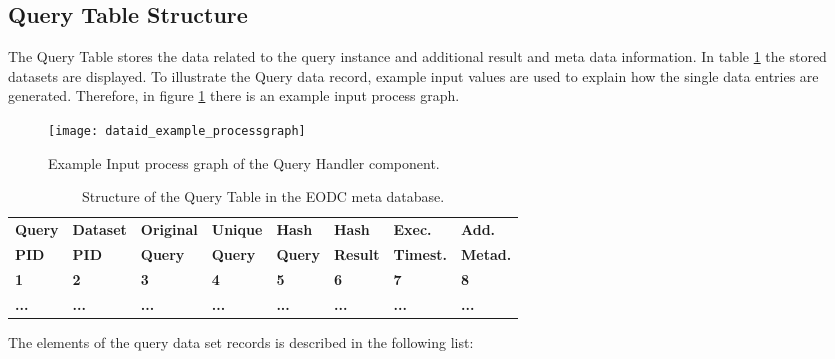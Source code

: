 \documentclass[draft,final]{vutinfth} %
\begin{document}
\subsection{Query Table Structure}

The Query Table stores the data related to the query instance and additional result and meta data information. In table \ref{Tab:querytable} the stored datasets are displayed. To illustrate the Query data record, example input values are used to explain how the single data entries are generated. Therefore, in figure \ref{fig:processgraph_example} there is an example input process graph.   

\begin{figure}[h]
	\centering
	\texttt{[image: dataid\_example\_processgraph]}
	\caption{Example Input process graph of the Query Handler component.}
	\label{fig:processgraph_example} %
\end{figure}

\begin{table}[]
	\caption{Structure of the Query Table in the EODC meta database.}
	\begin{tabular}{|l|l|l|l|l|l|l|l|}
	\hline	\textbf{Query} & \textbf{Dataset} & \textbf{Original} & \textbf{Unique} & \textbf{Hash} & \textbf{Hash} &
		\textbf{Exec.} & \textbf{Add.}  \\ 
		\textbf{PID} & \textbf{PID} & \textbf{Query} & \textbf{Query} & \textbf{Query} & \textbf{Result} &
		\textbf{Timest.} & \textbf{Metad.}  \\ \hline
		\textbf{1} & \textbf{2} & \textbf{3} & \textbf{4} & \textbf{5} & \textbf{6} &
		\textbf{7} & \textbf{8} \\ \hline
		\textbf{...} & \textbf{...} & \textbf{...} & \textbf{...} & \textbf{...} & \textbf{...} & \textbf{...} & \textbf{...} \\ \hline
	\end{tabular}
	\label{Tab:querytable}
\end{table}

The elements of the query data set records is described in the following list:
\end{document}
